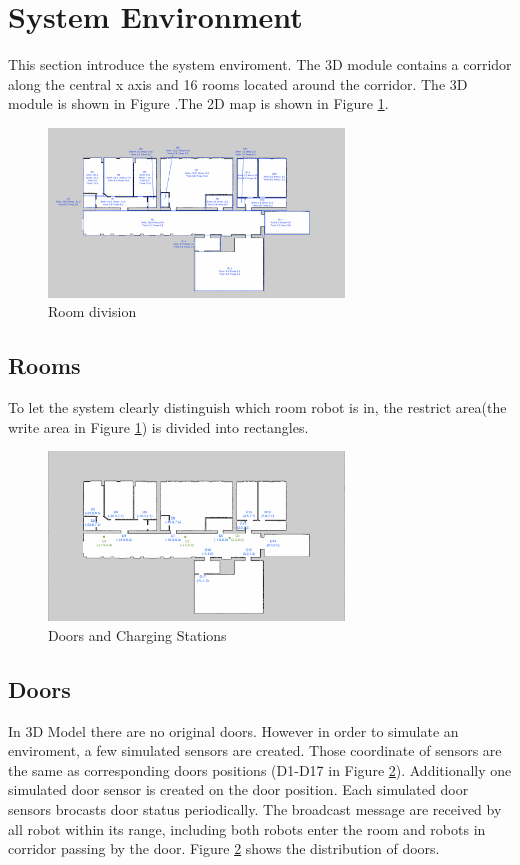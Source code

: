 \section{System Environment}
This section introduce the system enviroment. The 3D module contains a corridor along the central x axis and 16 rooms located around the corridor. The 3D module is shown in Figure   .The 2D map is shown in Figure \ref{fig:room_division}.


\begin{figure}[htbp]
	\centering
	\includegraphics[width = 0.7\textwidth]{content/images/ch3/room_division.png}
	\caption{Room division}
	\label{fig:room_division}
\end{figure}

\subsection{Rooms}
To let the system clearly distinguish which room robot is in, the restrict area(the write area in Figure \ref{fig:room_division}) is divided into rectangles.

\begin{figure}[htbp]
	\centering
	\includegraphics[width = 0.7\textwidth]{content/images/ch3/positions_door_station.png}
	\caption{Doors and Charging Stations}
	\label{fig:positions_door_station}
\end{figure}

\subsection{Doors}
In 3D Model there are no original doors. However in order to simulate an enviroment, a few simulated sensors are created. Those coordinate of sensors are the same as corresponding doors positions (D1-D17 in Figure \ref{fig:positions_door_station}).
Additionally one simulated door sensor is created on the door position. Each simulated door sensors brocasts door status periodically. The broadcast message are received by all robot within its range, including both robots enter the room and robots in corridor passing by the door.
Figure \ref{fig:positions_door_station} shows the distribution of doors.

